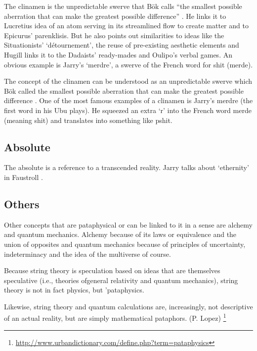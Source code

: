 The clinamen is the unpredictable swerve that Bök calls ``the smallest possible aberration that can make the greatest possible difference''  \autocite[p.43]{Boek2002}. He links it to Lucretius idea of an atom serving in its streamlined flow to create matter and to Epicurus' parenklisis. But he also points out similarities to ideas like the Situationists' `détournement', the reuse of pre-existing aesthetic elements and Hugill links it to the Dadaists' ready-mades and Oulipo's verbal games. An obvious example is Jarry's `merdre', a swerve of the French word for shit (merde).

The concept of the clinamen can be understood as an unpredictable swerve which Bök called the smallest possible aberration that can make the greatest possible difference \autocite{Boek2002}. One of the most famous examples of a clinamen is Jarry's merdre (the first word in his Ubu plays). He squeezed an extra `r' into the French word merde (meaning shit) and translates into something like pshit.


\subsection{Absolute}

The absolute is a reference to a transcended reality. Jarry talks about `ethernity' in Faustroll \autocite[p.104]{Jarry1996}.


\subsection*{Others}

Other concepts that are pataphysical or can be linked to it in a sense are alchemy and quantum mechanics. Alchemy because of its laws or equivalence and the union of opposites \autocite{Hugill2012} and quantum mechanics because of principles of uncertainty, indeterminacy and the idea of the multiverse of course.

\begin{fcom}
  Because string theory is speculation based on ideas that are themselves speculative (i.e., theories ofgeneral relativity and quantum mechanics), string theory is not in fact physics, but 'pataphysics.
\end{fcom}

\begin{fcom}
  Likewise, string theory and quantum calculations are, increasingly, not descriptive of an actual reality, but are simply mathematical pataphors. (P. Lopez) \footnote{\url{http://www.urbandictionary.com/define.php?term=pataphysics}}
\end{fcom}


